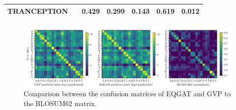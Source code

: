 \begin{table}[!t]
\begin{center}
\begin{scriptsize}
\begin{sc}
\begin{tabular}{@{}ccccccc@{}}
TRANCEPTION            &                                   & \textbf{0.429}      & \textbf{0.299}           & 0.143            & \textbf{0.619}                                                                       & 0.012                                                                    \\ \bottomrule
\end{tabular}
\end{sc}
\end{scriptsize}
\end{center}
\vskip -0.1in
\end{table}


\begin{figure}
    \centering
    \includegraphics[width=\textwidth]{masters-report/figures/confusion_matrices.pdf}
    \caption{Comparison between the confusion matrices of EQGAT and GVP to the BLOSUM62 matrix.}
    \label{fig:confusions}
\end{figure}
